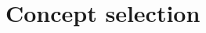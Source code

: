 \documentclass[whitelogo]{tudelft-report}
\begin{document}
{{%
{\chapter{Concept selection}

}}}
\end{document}
